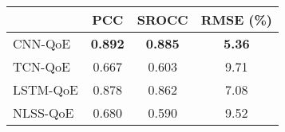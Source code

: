 
  \begin{tabular}{|l|c|c|c|}
    \hline
    & PCC & SROCC & RMSE (\%)\\ \hline
    CNN-QoE & \textbf{0.892} & \textbf{0.885} & \textbf{5.36} \\ \hline
    TCN-QoE       & 0.667 & 0.603 & 9.71 \\ \hline
    LSTM-QoE \cite{QoEModel_LSTM}        & 0.878 & 0.862 & 7.08 \\ \hline
    NLSS-QoE    \cite{QoEModel_NLSS}    & 0.680 & 0.590 & 9.52 \\ \hline
  \end{tabular}